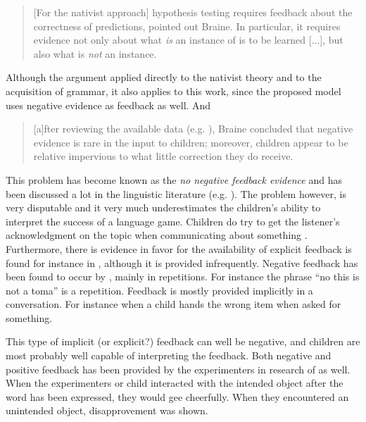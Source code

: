 \begin{quote}
[For the nativist approach] hypothesis testing requires feedback about the correctness of predictions, pointed out Braine. In particular, it requires evidence not only about what {\em is} an instance of is to be learned [...], but also what is {\em not} an instance.\cite[p. 74]{bowerman:1988}
\end{quote}

Although the argument applied directly to the nativist theory and to the acquisition of grammar, it also applies to this work, since the proposed model uses negative evidence as feedback as well. And

\begin{quote}
[a]fter reviewing the available data (e.g. \cite{brownhanlon:1970}), Braine concluded that negative evidence is rare in the input to children; moreover, children appear to be relative impervious to what little correction they do receive. \cite[p. 75]{bowerman:1988}
\end{quote}

This problem has become known as the {\em no negative feedback evidence} and has been discussed a lot in the linguistic literature (e.g. \cite{pinker:1994,hawkins:1988}). The problem however, is very disputable and it very much underestimates the children's ability to interpret the success of a language game. Children do try to get the listener's acknowledgment on the topic when communicating about something \cite{clarkclark:1977}. Furthermore, there is evidence in favor for the availability of explicit feedback is found for instance in \cite{brownhanlon:1970,hirsch-paseketal:1984,demetrasetal:1986}, although it is provided infrequently. Negative feedback has been found to occur by \cite{moerk:1983,hirsch-paseketal:1984,demetrasetal:1986}, mainly in repetitions. For instance the phrase ``no this is not a toma'' is a repetition. Feedback is mostly provided implicitly in a conversation. For instance when a child hands the wrong item when asked for something.  

This type of implicit (or explicit?) feedback can well be negative, and children are most probably well capable of interpreting the feedback. Both negative and positive feedback has been provided by the experimenters in research of \cite{tomasellobarton:1994} as well. When the experimenters or child interacted with the intended object after the word has been expressed, they would gee cheerfully. When they encountered an unintended object, disapprovement was shown.

